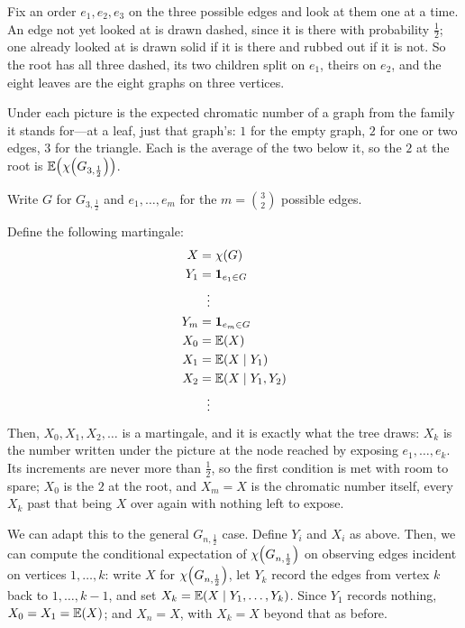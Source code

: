Fix an order $e_1, e_2, e_3$ on the three possible edges and look at them one at a time. An edge not yet looked at is drawn dashed, since it is there with probability $\frac{1}{2}$; one already looked at is drawn solid if it is there and rubbed out if it is not. So the root has all three dashed, its two children split on $e_1$, theirs on $e_2$, and the eight leaves are the eight graphs on three vertices.

Under each picture is the expected chromatic number of a graph from the family it stands for---at a leaf, just that graph's: $1$ for the empty graph, $2$ for one or two edges, $3$ for the triangle. Each is the average of the two below it, so the $2$ at the root is $\mathbb{E}\!\left( \chi\!\left( G_{3, \frac{1}{2}} \right) \right)$.

Write $G$ for $G_{3, \frac{1}{2}}$ and $e_1, \ldots, e_m$ for the $m = \binom{3}{2}$ possible edges.

Define the following martingale:
\begin{align*}
    X &= \chi(G) \\
    Y_1 &= \mathbf{1}_{e_1 \in G} \\
    & \,\,\, \vdots \\
    Y_m &= \mathbf{1}_{e_m \in G} \\
    X_0 &= \mathbb{E}(X) \\
    X_1 &= \mathbb{E}\!\left( X \mid Y_1 \right) \\
    X_2 &= \mathbb{E}\!\left( X \mid Y_1, Y_2 \right) \\
    & \,\,\, \vdots
\end{align*}
Then, $X_0, X_1, X_2, \ldots$ is a martingale, and it is exactly what the tree draws: $X_k$ is the number written under the picture at the node reached by exposing $e_1, \ldots, e_k$. Its increments are never more than $\frac{1}{2}$, so the first condition is met with room to spare; $X_0$ is the $2$ at the root, and $X_m = X$ is the chromatic number itself, every $X_k$ past that being $X$ over again with nothing left to expose.

We can adapt this to the general $G_{n, \frac{1}{2}}$ case. Define $Y_i$ and $X_i$ as above. Then, we can compute the conditional expectation of $\chi\!\left( G_{n, \frac{1}{2}} \right)$ on observing edges incident on vertices $1, \ldots, k$: write $X$ for $\chi\!\left( G_{n, \frac{1}{2}} \right)$, let $Y_k$ record the edges from vertex $k$ back to $1, \ldots, k-1$, and set $X_k = \mathbb{E}\!\left( X \mid Y_1, \ldots, Y_k \right)$. Since $Y_1$ records nothing, $X_0 = X_1 = \mathbb{E}(X)$; and $X_n = X$, with $X_k = X$ beyond that as before.

